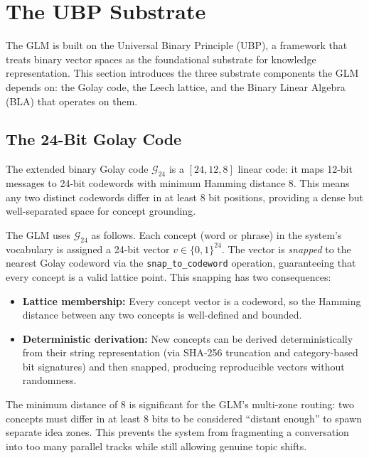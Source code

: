 \documentclass[11pt,a4paper]{article}
\begin{document}
\section{The UBP Substrate}
\label{sec:substrate}

The GLM is built on the Universal Binary Principle (UBP), a framework that treats binary vector spaces as the foundational substrate for knowledge representation. This section introduces the three substrate components the GLM depends on: the Golay code, the Leech lattice, and the Binary Linear Algebra (BLA) that operates on them.

\subsection{The 24-Bit Golay Code}

The extended binary Golay code $\mathcal{G}_{24}$ is a $[24, 12, 8]$ linear code: it maps 12-bit messages to 24-bit codewords with minimum Hamming distance 8. This means any two distinct codewords differ in at least 8 bit positions, providing a dense but well-separated space for concept grounding.

The GLM uses $\mathcal{G}_{24}$ as follows. Each concept (word or phrase) in the system's vocabulary is assigned a 24-bit vector $v \in \{0,1\}^{24}$. The vector is \emph{snapped} to the nearest Golay codeword via the \texttt{snap\_to\_codeword} operation, guaranteeing that every concept is a valid lattice point. This snapping has two consequences:

\begin{itemize}
    \item \textbf{Lattice membership:} Every concept vector is a codeword, so the Hamming distance between any two concepts is well-defined and bounded.
    \item \textbf{Deterministic derivation:} New concepts can be derived deterministically from their string representation (via SHA-256 truncation and category-based bit signatures) and then snapped, producing reproducible vectors without randomness.
\end{itemize}

The minimum distance of 8 is significant for the GLM's multi-zone routing: two concepts must differ in at least 8 bits to be considered ``distant enough'' to spawn separate idea zones. This prevents the system from fragmenting a conversation into too many parallel tracks while still allowing genuine topic shifts.
\end{document}
